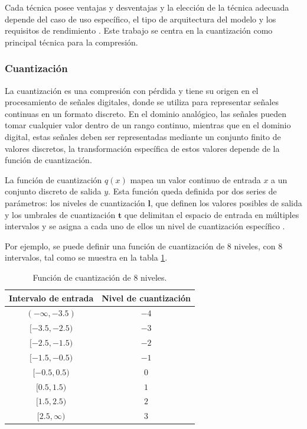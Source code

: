 Cada técnica posee ventajas y desventajas y la elección de la técnica adecuada depende del caso de uso específico, el tipo de arquitectura del modelo y los requisitos de rendimiento \cite{DBLP:journals/corr/abs-2010-03954}. Este trabajo se centra en la cuantización como principal técnica para la compresión.

\subsubsection{Cuantización}
\label{sec:cuantizacion}

La cuantización es una compresión con pérdida y tiene su origen en el procesamiento de señales digitales, donde se utiliza para representar señales continuas en un formato discreto. En el dominio analógico, las señales pueden tomar cualquier valor dentro de un rango continuo, mientras que en el dominio digital, estas señales deben ser representadas mediante un conjunto finito de valores discretos, la transformación específica de estos valores depende de la función de cuantización.

La función de cuantización $q(x)$ mapea un valor continuo de entrada $x$ a un conjunto discreto de salida $y$. Esta función queda definida por dos series de parámetros: los niveles de cuantización $\mathbf{l}$, que definen los valores posibles de salida y los umbrales de cuantización $\mathbf{t}$ que delimitan el espacio de entrada en m\'ultiples intervalos y se asigna a cada uno de ellos un nivel de cuantización específico \cite{sayood2017introduction}.

Por ejemplo, se puede definir una función de cuantización de $8$ niveles, con $8$ intervalos, tal como se muestra en la tabla \ref{tab:quantization_example}.

\begin{table}[H]
    \centering
    \caption{Función de cuantización de 8 niveles.}
    \begin{tabular}{c|c}
        \hline
        \textbf{Intervalo de entrada} & \textbf{Nivel de cuantización} \\
        \hline
        $(-\infty, -3.5)$ & $-4$ \\
        $[-3.5, -2.5)$ & $-3$ \\
        $[-2.5, -1.5)$ & $-2$ \\
        $[-1.5, -0.5)$ & $-1$ \\
        $[-0.5, 0.5)$ & $0$ \\
        $[0.5, 1.5)$ & $1$ \\
        $[1.5, 2.5)$ & $2$ \\
        $[2.5, \infty)$ & $3$ \\
        \hline
    \end{tabular}
    \label{tab:quantization_example}
\end{table}

